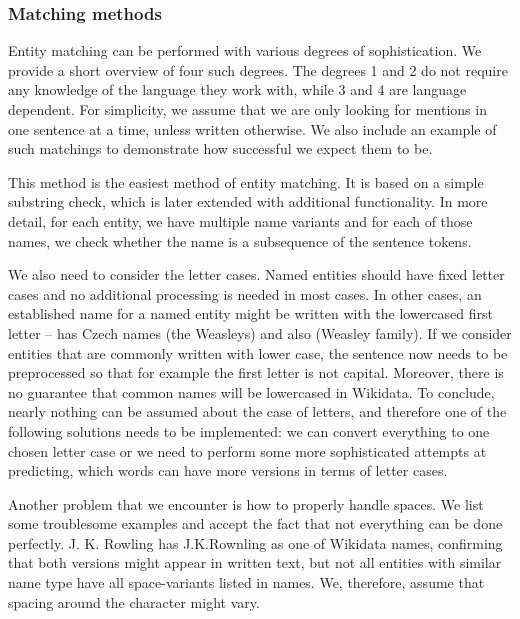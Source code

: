 \subsubsection{Matching methods}
Entity matching can be performed with various degrees of sophistication. We provide a short overview of four such degrees. The degrees 1 and 2 do not require any knowledge of the language they work with, while 3 and 4 are language dependent. For simplicity, we assume that we are only looking for mentions in one sentence at a time, unless written otherwise. We also include an example of such matchings to demonstrate how successful we expect them to be.



 This method is the easiest method of entity matching. It is based on a simple substring check, which is later extended with additional functionality. In more detail, for each entity, we have multiple name variants and for each of those names, we check whether the name is a subsequence of the sentence tokens.



We also need to consider the letter cases. Named entities should have fixed letter cases and no additional processing is needed in most cases. In other cases, an established name for a named entity might be written with the lowercased first letter --  has Czech names  (the Weasleys) and also  (Weasley family). If we consider entities that are commonly written with lower case, the sentence now needs to be preprocessed so that for example the first letter is not capital. Moreover, there is no guarantee that common names will be lowercased in Wikidata. To conclude, nearly nothing can be assumed about the case of letters, and therefore one of the following solutions needs to be implemented: we can convert everything to one chosen letter case or we need to perform some more sophisticated attempts at predicting, which words can have more versions in terms of letter cases.

Another problem that we encounter is how to properly handle spaces. We list some troublesome examples and accept the fact that not everything can be done perfectly. J. K. Rowling has J.K.Rownling as one of Wikidata names, confirming that both versions might appear in written text, but not all entities with similar name type have all space-variants listed in names. We, therefore, assume that spacing around the \vuvozovkach{-} character might vary.

